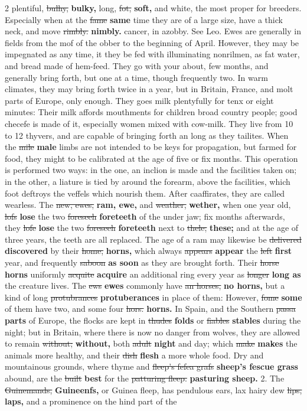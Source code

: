 \documentclass[10pt]{article}
\begin{document}
\begin{multicols}{2}
plentiful, \sout{bulhy,} \textbf{bulky,} long, \sout{fot,} \textbf{soft,} and white, the most proper for breeders. Especially when at the \sout{fame} \textbf{same} time they are of a large size, have a thick neck, and move \sout{rimbly.} \textbf{nimbly.} cancer, in azobby. See Leo. Ewes are generally in fields from the mof of the obber to the beginning of April. However, they may be impegnated as any time, it they be fed with illuminating nonrilmen, as fat water, and bread made of hem-feed. They go with your about, few months, and generally bring forth, but one at a time, though frequently two. In warm climates, they may bring forth twice in a year, but in Britain, France, and molt parts of Europe, only enough. They goes milk plentyfully for tenx or eight minutes: Their milk affords mouthments for children broad country people; good checefe is made of it, especially women mixed with cow-milk. They live from 10 to 12 thyvers, and are capable of bringing forth an long as they tailites. When the \sout{mile} \textbf{male} limbs are not intended to be keys for propagation, but farmed for food, they might to be calibrated at the age of five or fix months. This operation is performed two ways: in the one, an inclion is made and the facilities taken on; in the other, a liature is tied by around the forearm, above the facilities, which foot deftroys the veffels which nourish them. After caaffirates, they are called wearless. The \sout{new, ewes,} \textbf{ram, ewe,} and \sout{weather,} \textbf{wether,} when one year old, \sout{lofs} \textbf{lose} the two \sout{foreseeh} \textbf{foreteeth} of the under jaw; fix months afterwards, they \sout{lofe} \textbf{lose} the two \sout{foreseeh} \textbf{foreteeth} next to \sout{thele;} \textbf{these;} and at the age of three years, the teeth are all replaced. The age of a ram may likewise be \sout{delivered} \textbf{discovered} by their \sout{home,} \textbf{horns,} which always \sout{appears} \textbf{appear} the \sout{left} \textbf{first} year, and frequently \sout{saboon} \textbf{as soon} as they are brought forth. Their \sout{horse} \textbf{horns} uniformly \sout{acquite} \textbf{acquire} an additional ring every year as \sout{longer} \textbf{long as} the creature lives. The \sout{ews} \textbf{ewes} commonly have \sout{an horses,} \textbf{no horns,} but a kind of long \sout{protubrances} \textbf{protuberances} in place of them: However, \sout{fome} \textbf{some} of them have two, and some four \sout{hors.} \textbf{horns.} In Spain, and the Southern \sout{passa} \textbf{parts} of Europe, the flocks are kept in \sout{thudes} \textbf{folds} or \sout{fiables} \textbf{stables} during the night; but in Britain, where there is now no danger from wolves, they are allowed to remain \sout{without;} \textbf{without,} both \sout{adult} \textbf{night} and day; which \sout{make} \textbf{makes} the animals more healthy, and their \sout{dish} \textbf{flesh} a more whole food. Dry and mountainous grounds, where thyme and \sout{fleep's fefea grafs} \textbf{sheep's fescue grass} abound, are the \sout{built} \textbf{best} for the \sout{patturing fleep.} \textbf{pasturing sheep.} 2. The \sout{Guinemands,} \textbf{Guineenfs,} or Guinea fleep, has pendulous ears, lax hairy dew \sout{lips,} \textbf{laps,} and a prominence on the hind part of the 
\end{multicols}
\end{document}
